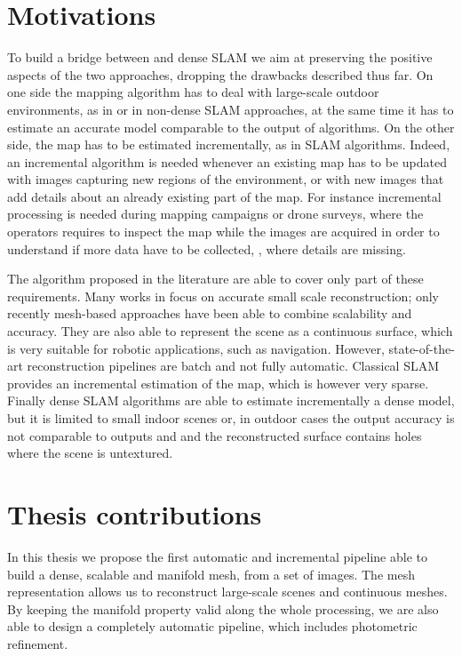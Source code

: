 \section{Motivations}
To build a bridge between \mvs and dense SLAM we aim at preserving the positive aspects of the two approaches, dropping the drawbacks described thus far. 
On one side the mapping algorithm has to deal with large-scale outdoor environments, as in \mvs or in non-dense SLAM approaches, at the same time it has to estimate an accurate model comparable to the output of \mvs algorithms.
On the other  side, the map has to be estimated incrementally, as in SLAM algorithms.
Indeed, an incremental algorithm is needed whenever an existing map has to be updated with images capturing new regions of the environment, or with new images that add details about an already existing part of the map.
For instance incremental processing  is needed during mapping campaigns or drone surveys, where the operators requires to inspect the map while the images are  acquired in order to understand if more data have to be collected, \eg, where details are missing.


The algorithm proposed in the literature are able to cover only part of these requirements.
Many works in \mvs focus on accurate small scale reconstruction; only recently mesh-based approaches have been able to combine scalability and accuracy. They are also able to represent the scene as  a continuous surface, which is very suitable for robotic applications, such as navigation.
However, state-of-the-art \mvs reconstruction pipelines are batch and not fully automatic. 
Classical SLAM provides an incremental estimation of the map, which is however very sparse.
Finally dense SLAM algorithms are able to estimate incrementally a dense model, but it is limited to small indoor scenes or, in outdoor cases the output accuracy is not comparable to \mvs outputs and and the reconstructed surface contains holes where the scene is untextured.

\section{Thesis contributions}
In this thesis we propose the first automatic and incremental pipeline able to build a dense, scalable and manifold mesh, from a set of images.
The mesh representation allows us  to reconstruct  large-scale scenes and continuous meshes.
By keeping the manifold property valid along the whole processing, we are also able to design a completely automatic pipeline, which includes photometric refinement.

